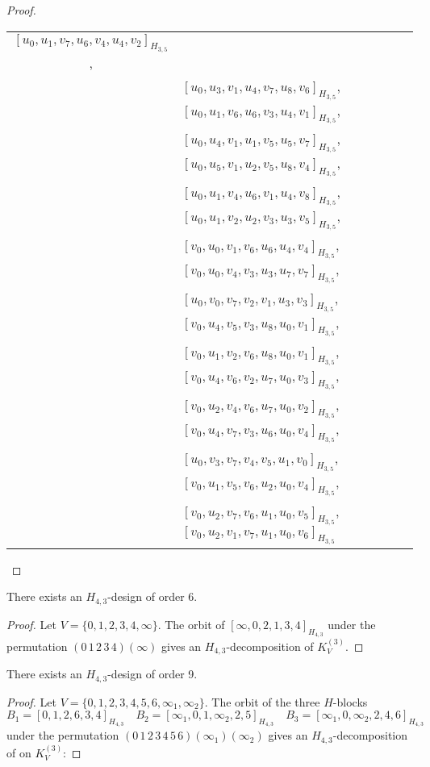 \begin{subappendices}
\begin{proof}
{\begin{longtable}{|c|l|}
  $[u_0, u_1, v_7, u_6, v_4, u_4, v_2]_{H_{3,5}}$, \\* &
  $[u_0, u_3, v_1, u_4, v_7, u_8, v_6]_{H_{3,5}}$,
  $[u_0, u_1, v_6, u_6, v_3, u_4, v_1]_{H_{3,5}}$, \\* &
  $[u_0, u_4, v_1, u_1, v_5, u_5, v_7]_{H_{3,5}}$,
  $[u_0, u_5, v_1, u_2, v_5, u_8, v_4]_{H_{3,5}}$, \\* &
  $[u_0, u_1, v_4, u_6, v_1, u_4, v_8]_{H_{3,5}}$,
  $[u_0, u_1, v_2, u_2, v_3, u_3, v_5]_{H_{3,5}}$, \\* &
  $[v_0, u_0, v_1, v_6, u_6, u_4, v_4]_{H_{3,5}}$,
  $[v_0, u_0, v_4, v_3, u_3, u_7, v_7]_{H_{3,5}}$, \\* &
  $[u_0, v_0, v_7, v_2, v_1, u_3, v_3]_{H_{3,5}}$,
  $[v_0, u_4, v_5, v_3, u_8, u_0, v_1]_{H_{3,5}}$, \\* &
  $[v_0, u_1, v_2, v_6, u_8, u_0, v_1]_{H_{3,5}}$,
  $[v_0, u_4, v_6, v_2, u_7, u_0, v_3]_{H_{3,5}}$, \\* &
  $[v_0, u_2, v_4, v_6, u_7, u_0, v_2]_{H_{3,5}}$,
  $[v_0, u_4, v_7, v_3, u_6, u_0, v_4]_{H_{3,5}}$, \\* &
  $[u_0, v_3, v_7, v_4, v_5, u_1, v_0]_{H_{3,5}}$,
  $[v_0, u_1, v_5, v_6, u_2, u_0, v_4]_{H_{3,5}}$, \\* &
  $[v_0, u_2, v_7, v_6, u_1, u_0, v_5]_{H_{3,5}}$,
  $[v_0, u_2, v_1, v_7, u_1, u_0, v_6]_{H_{3,5}}$
\\ \hline
\end{longtable}
}
\end{proof}


\begin{example} \label{eg:H_43-6}
There exists an $H_{4,3}$-design of order 6.
\end{example}

\begin{proof}
Let $V = \{0,1,2,3,4,\infty\}$. The orbit of $[\infty, 0, 2, 1, 3, 4]_{H_{4,3}}$ under the permutation $(0\, 1\, 2\, 3\, 4)(\infty)$ gives an $H_{4,3}$-decomposition of $K_V^{(3)}$.
\end{proof}


\begin{example} \label{eg:H_43-9}
There exists an $H_{4,3}$-design of order 9.
\end{example}

\begin{proof}
Let $V = \{0,1,2,3,4,5,6,\infty_1,\infty_2\}$. The orbit of the three $H$-blocks
\[
    B_1 = [0,1,2,6,3,4]_{H_{4,3}} \quad
    B_2 = [\infty_1, 0, 1, \infty_2, 2, 5]_{H_{4,3}} \quad
    B_3 = [\infty_1, 0, \infty_2, 2, 4, 6]_{H_{4,3}}
\]
under the permutation $(0\, 1\, 2\, 3\, 4\, 5\, 6)(\infty_1)(\infty_2)$ gives an $H_{4,3}$-decomposition of on $K_V^{(3)}$:


\end{proof}
\end{subappendices}
